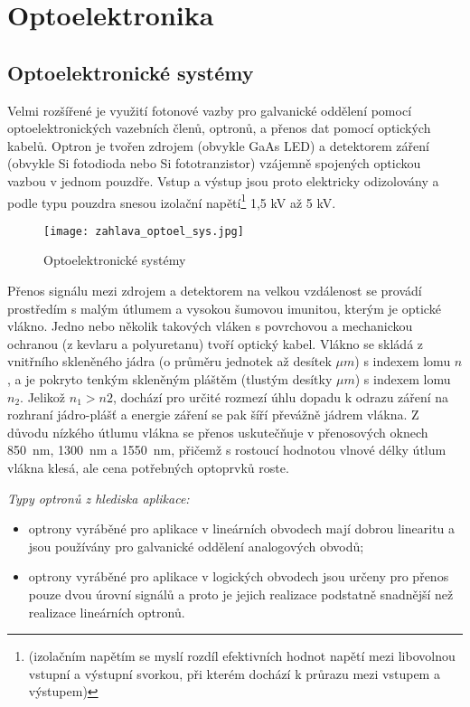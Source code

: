 \chapter{Optoelektronika}\label{ES:kap_optocoupler}
\minitoc
\newpage
  \section{Optoelektronické systémy}
    Velmi rozšířené je využití fotonové vazby pro galvanické oddělení pomocí optoelektronických vazebních 
    členů, optronů, a přenos dat pomocí optických kabelů. Optron je tvořen zdrojem (obvykle GaAs LED) a 
    detektorem záření (obvykle Si fotodioda nebo Si fototranzistor) vzájemně spojených optickou vazbou v 
    jednom pouzdře. Vstup a výstup jsou proto elektricky odizolovány a podle typu pouzdra snesou izolační 
    napětí\footnote{(izolačním napětím se myslí rozdíl efektivních hodnot napětí mezi libovolnou vstupní a 
    výstupní svorkou, při kterém dochází k průrazu mezi vstupem a výstupem)} 1,5 kV až 5 kV.     
    \begin{figure}[ht!]  
      \centering
      \texttt{[image: zahlava\_optoel\_sys.jpg]}
      \caption{Optoelektronické systémy \cite[p.~179]{Zahlava2001}}
      \label{ES:fig_opto_sys}
    \end{figure}
  
    Přenos signálu mezi zdrojem a detektorem na velkou vzdálenost se provádí prostředím s malým útlumem a 
    vysokou šumovou imunitou, kterým je optické vlákno. Jedno nebo několik takových vláken s povrchovou a 
    mechanickou ochranou (z kevlaru a polyuretanu) tvoří optický kabel. Vlákno se skládá z vnitřního 
    skleněného jádra (o průměru jednotek až desítek \(\mu m\)) s indexem lomu \(n\), a je pokryto tenkým 
    skleněným pláštěm (tlustým desítky \(\mu m\)) s indexem lomu \(n_2\). Jelikož \(n_1>n2\), dochází pro 
    určité rozmezí úhlu dopadu k odrazu záření na rozhraní jádro-plášť a energie záření se pak šíří převážně 
    jádrem vlákna. Z důvodu nízkého útlumu vlákna se přenos uskutečňuje v přenosových oknech 
    \SI{850}{\nano\meter}, \SI{1300}{\nano\meter} a \SI{1550}{\nano\meter}, přičemž s rostoucí hodnotou 
    vlnové délky útlum vlákna klesá, ale cena potřebných optoprvků roste.
    
    \emph{Typy optronů z hlediska aplikace:}
      \begin{itemize}
        \item optrony vyráběné pro aplikace v lineárních obvodech mají dobrou linearitu a jsou
              používány pro galvanické oddělení analogových obvodů;
        \item optrony vyráběné pro aplikace v logických obvodech jsou určeny pro přenos pouze dvou
              úrovní signálů a proto je jejich realizace podstatně snadnější než realizace
              lineárních optronů.
      \end{itemize}
  
